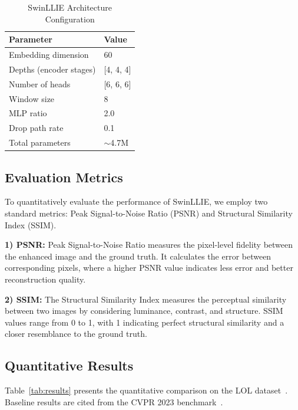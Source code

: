 \documentclass[conference]{IEEEtran}
\begin{document}
\begin{table}[htbp]
\caption{SwinLLIE Architecture Configuration}
\centering
\begin{tabular}{ll}
\toprule
\textbf{Parameter} & \textbf{Value} \\
\midrule
Embedding dimension & 60 \\
Depths (encoder stages) & [4, 4, 4] \\
Number of heads & [6, 6, 6] \\
Window size & 8 \\
MLP ratio & 2.0 \\
Drop path rate & 0.1 \\
Total parameters & $\sim$4.7M \\
\bottomrule
\end{tabular}
\label{tab:config}
\end{table}

\subsection{Evaluation Metrics}

To quantitatively evaluate the performance of SwinLLIE, we employ two standard metrics: Peak Signal-to-Noise Ratio (PSNR) and Structural Similarity Index (SSIM).

\textbf{1) PSNR:} Peak Signal-to-Noise Ratio measures the pixel-level fidelity between the enhanced image and the ground truth. It calculates the error between corresponding pixels, where a higher PSNR value indicates less error and better reconstruction quality.

\textbf{2) SSIM:} The Structural Similarity Index measures the perceptual similarity between two images by considering luminance, contrast, and structure. SSIM values range from 0 to 1, with 1 indicating perfect structural similarity and a closer resemblance to the ground truth.

\subsection{Quantitative Results}

Table~\ref{tab:results} presents the quantitative comparison on the LOL dataset~\cite{lol_dataset}. Baseline results are cited from the CVPR 2023 benchmark~\cite{xu2023smg}.
\end{document}
